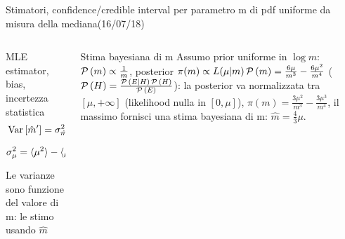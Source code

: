 \begin{wordonframe}{Stimatori, confidence/credible interval per parametro m di pdf uniforme da misura della mediana(16/07/18)}
	\begin{columns}[T]\begin{column}{0.5\textwidth}
			\begin{block}{MLE estimator, bias, incertezza statistica}
				\begin{align*}
				&\operatorname{Var}{[\hat{m}']}=\sigma^2_{\hat{m}'}=4\operatorname{Var}{\mu}=4\sigma_{\mu}^2\\
				&\sigma^2_{\mu}=\langle \mu^2 \rangle-\langle \mu \rangle^2=\frac{m^2}{20}
				\end{align*}
				Le varianze sono funzione del valore di m: le stimo usando $\hat{m}$
			\end{block}
		\end{column}\begin{column}{0.5\textwidth}
			\begin{block}{Stima bayesiana di m}
				Assumo prior uniforme in $\log{m}$: $\operatorname{\mathcal{P}}{(m)}\propto\frac{1}{m}$, posterior $\pi(m)\propto L(\mu|m)\operatorname{\mathcal{P}}{(m)}=\frac{6\mu}{m^3}-\frac{6\mu^2}{m^4}$ ($\operatorname{\mathcal{P}}{(H)}=\frac{\operatorname{\mathcal{P}}{(E|H)\operatorname{\mathcal{P}}{(H)}}}{\operatorname{\mathcal{P}}{(E)}}$): la posterior va normalizzata tra $[\mu,+\infty]$ (likelihood nulla  in $[0,\mu]$), $\pi(m)=\frac{3\mu^2}{m^3}-\frac{3\mu^3}{m^4}$, il massimo fornisci una stima bayesiana di m: $\hat{m}=\frac{4}{3}\mu$.
			\end{block}
	\end{column}\end{columns}
\end{wordonframe}


